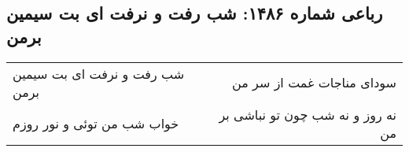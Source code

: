 \begin{center}
\section*{رباعی شماره ۱۴۸۶: شب رفت و نرفت ای بت سیمین برمن}
\label{sec:1486}
\begin{longtable}{l p{0.5cm} r}
شب رفت و نرفت ای بت سیمین برمن
&&
سودای مناجات غمت از سر من
\\
خواب شب من توئی و نور روزم
&&
نه روز و نه شب چون تو نباشی بر من
\\
\end{longtable}
\end{center}
